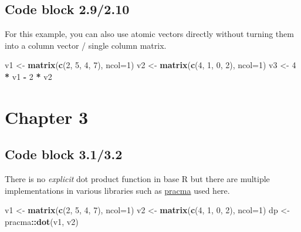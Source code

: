 \documentclass[
]{book}
\newenvironment{Shaded}{\begin{snugshade}}{\end{snugshade}}
\newcommand{\DataTypeTok}[1]{\textcolor[rgb]{0.13,0.29,0.53}{#1}}
\newcommand{\DecValTok}[1]{\textcolor[rgb]{0.00,0.00,0.81}{#1}}
\newcommand{\KeywordTok}[1]{\textcolor[rgb]{0.13,0.29,0.53}{\textbf{#1}}}
\newcommand{\NormalTok}[1]{#1}
\newcommand{\OperatorTok}[1]{\textcolor[rgb]{0.81,0.36,0.00}{\textbf{#1}}}
\newcommand{\StringTok}[1]{\textcolor[rgb]{0.31,0.60,0.02}{#1}}
\begin{document}
\hypertarget{code-block-2.92.10}{%
\subsection*{Code block 2.9/2.10}\label{code-block-2.92.10}}

For this example, you can also use atomic vectors directly without turning them into a column vector / single column matrix.

\begin{Shaded}
\begin{Highlighting}[]
\NormalTok{v1 \textless{}{-}}\StringTok{ }\KeywordTok{matrix}\NormalTok{(}\KeywordTok{c}\NormalTok{(}\DecValTok{2}\NormalTok{, }\DecValTok{5}\NormalTok{, }\DecValTok{4}\NormalTok{, }\DecValTok{7}\NormalTok{), }\DataTypeTok{ncol=}\DecValTok{1}\NormalTok{)}
\NormalTok{v2 \textless{}{-}}\StringTok{ }\KeywordTok{matrix}\NormalTok{(}\KeywordTok{c}\NormalTok{(}\DecValTok{4}\NormalTok{, }\DecValTok{1}\NormalTok{, }\DecValTok{0}\NormalTok{, }\DecValTok{2}\NormalTok{), }\DataTypeTok{ncol=}\DecValTok{1}\NormalTok{)}
\NormalTok{v3 \textless{}{-}}\StringTok{ }\DecValTok{4} \OperatorTok{*}\StringTok{ }\NormalTok{v1  }\OperatorTok{{-}}\StringTok{ }\DecValTok{2} \OperatorTok{*}\StringTok{ }\NormalTok{v2}
\end{Highlighting}
\end{Shaded}

\hypertarget{chapter-3}{%
\section*{Chapter 3}\label{chapter-3}}

\hypertarget{code-block-3.13.2}{%
\subsection*{Code block 3.1/3.2}\label{code-block-3.13.2}}

There is no \emph{explicit} dot product function in base R but there are multiple implementations in various libraries such as \href{https://github.com/cran/pracma}{pracma} used here.

\begin{Shaded}
\begin{Highlighting}[]
\NormalTok{v1 \textless{}{-}}\StringTok{ }\KeywordTok{matrix}\NormalTok{(}\KeywordTok{c}\NormalTok{(}\DecValTok{2}\NormalTok{, }\DecValTok{5}\NormalTok{, }\DecValTok{4}\NormalTok{, }\DecValTok{7}\NormalTok{), }\DataTypeTok{ncol=}\DecValTok{1}\NormalTok{)}
\NormalTok{v2 \textless{}{-}}\StringTok{ }\KeywordTok{matrix}\NormalTok{(}\KeywordTok{c}\NormalTok{(}\DecValTok{4}\NormalTok{, }\DecValTok{1}\NormalTok{, }\DecValTok{0}\NormalTok{, }\DecValTok{2}\NormalTok{), }\DataTypeTok{ncol=}\DecValTok{1}\NormalTok{)}
\NormalTok{dp \textless{}{-}}\StringTok{ }\NormalTok{pracma}\OperatorTok{::}\KeywordTok{dot}\NormalTok{(v1, v2)}
\end{Highlighting}
\end{Shaded}
\end{document}
